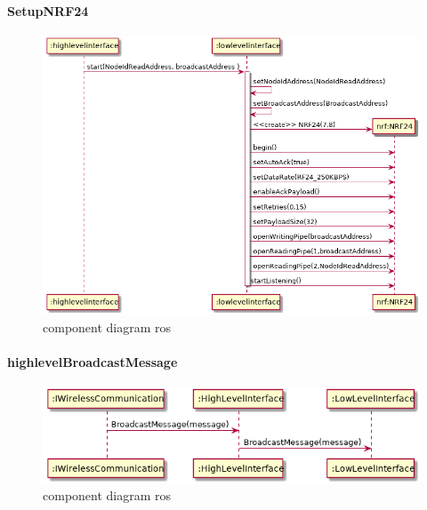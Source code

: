 \documentclass[a4paper, 11pt, oneside]{report}
\begin{document}
\paragraph{SetupNRF24}
\label{DetailedDesign:NRF24:sequence:SetupNRF24}

\begin{figure}[H]
	\begin{center}\includegraphics[width=1\linewidth]{UML/out/NRF24/sequence/SetupNRF24/SetupNRF24.png}\end{center}
	\caption{component diagram ros}
	\label{fig:NRF24:sequence:SetupNRF24}
\end{figure}


\paragraph{highlevelBroadcastMessage}
\label{DetailedDesign:NRF24:sequence:highlevelBroadcastMessage}

\begin{figure}[H]
	\begin{center}\includegraphics[width=1\linewidth]{UML/out/NRF24/sequence/highlevelBroadcastMessage/highlevelBroadcastMessage.png}\end{center}
	\caption{component diagram ros}
	\label{fig:NRF24:sequence:highlevelBroadcastMessage}
\end{figure}
\end{document}
